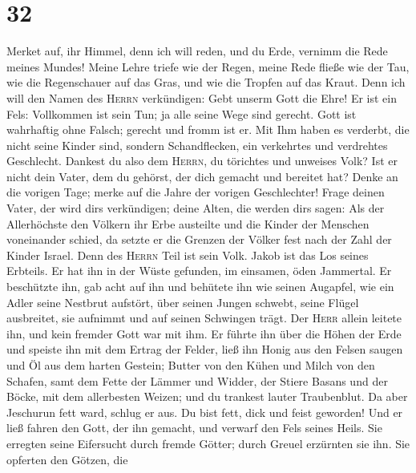 \hypertarget{section-31}{%
\section{32}\label{section-31}}

 Merket auf, ihr Himmel, denn ich will reden, und du Erde,
vernimm die Rede meines Mundes!  Meine Lehre triefe wie
der Regen, meine Rede fließe wie der Tau, wie die Regenschauer auf das
Gras, und wie die Tropfen auf das Kraut.  Denn ich will
den Namen des \textsc{Herrn} verkündigen: Gebt unserm Gott die Ehre!
 Er ist ein Fels: Vollkommen ist sein Tun; ja alle seine
Wege sind gerecht. Gott ist wahrhaftig ohne Falsch; gerecht und fromm
ist er.  Mit Ihm haben es verderbt, die nicht seine Kinder
sind, sondern Schandflecken, ein verkehrtes und verdrehtes Geschlecht.
 Dankest du also dem \textsc{Herrn}, du törichtes und
unweises Volk? Ist er nicht dein Vater, dem du gehörst, der dich gemacht
und bereitet hat?  Denke an die vorigen Tage; merke auf
die Jahre der vorigen Geschlechter! Frage deinen Vater, der wird
dir\textquotesingle s verkündigen; deine Alten, die werden
dir\textquotesingle s sagen:  Als der Allerhöchste den
Völkern ihr Erbe austeilte und die Kinder der Menschen voneinander
schied, da setzte er die Grenzen der Völker fest nach der Zahl der
Kinder Israel.  Denn des \textsc{Herrn} Teil ist sein
Volk. Jakob ist das Los seines Erbteils.  Er hat ihn in
der Wüste gefunden, im einsamen, öden Jammertal. Er beschützte ihn, gab
acht auf ihn und behütete ihn wie seinen Augapfel,  wie
ein Adler seine Nestbrut aufstört, über seinen Jungen schwebt, seine
Flügel ausbreitet, sie aufnimmt und auf seinen Schwingen trägt.
 Der \textsc{Herr} allein leitete ihn, und kein fremder
Gott war mit ihm.  Er führte ihn über die Höhen der Erde
und speiste ihn mit dem Ertrag der Felder, ließ ihn Honig aus den Felsen
saugen und Öl aus dem harten Gestein;  Butter von den
Kühen und Milch von den Schafen, samt dem Fette der Lämmer und Widder,
der Stiere Basans und der Böcke, mit dem allerbesten Weizen; und du
trankest lauter Traubenblut.  Da aber Jeschurun fett
ward, schlug er aus. Du bist fett, dick und feist geworden! Und er ließ
fahren den Gott, der ihn gemacht, und verwarf den Fels seines Heils.
 Sie erregten seine Eifersucht durch fremde Götter; durch
Greuel erzürnten sie ihn.  Sie opferten den Götzen, die
